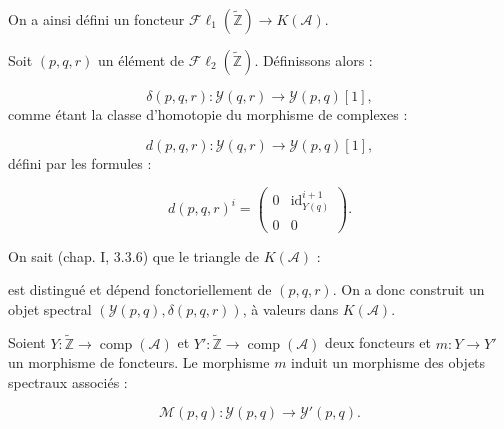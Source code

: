 \clearpage
{}%
\begingroup\small\setlength{\parskip}{0pt}\setlength{\emergencystretch}{1.5em}
\setlength{\abovedisplayskip}{4pt plus 2pt minus 2pt}%
\setlength{\belowdisplayskip}{4pt plus 2pt minus 2pt}%

On a ainsi défini un foncteur
$\mathcal{F}\ell_1(\widetilde{\mathbb Z})\longrightarrow K(\mathcal A)$.

Soit $(p,q,r)$ un élément de
$\mathcal{F}\ell_2(\widetilde{\mathbb Z})$. Définissons alors :

\begin{equation}
\delta(p,q,r)\colon\mathcal Y(q,r)\longrightarrow\mathcal Y(p,q)[1],
\tag{4.1.1.6}
\end{equation}
comme étant la classe d'homotopie du morphisme de complexes :

\begin{equation}
d(p,q,r)\colon\mathcal Y(q,r)\longrightarrow\mathcal Y(p,q)[1],
\tag{4.1.1.7}
\end{equation}
défini par les formules :

\begin{equation}
d(p,q,r)^i=
\begin{pmatrix}
0 & \operatorname{id}_{Y(q)}^{i+1}\\
0 & 0
\end{pmatrix}.
\tag{4.1.1.8}
\end{equation}

On sait (chap. I, 3.3.6) que le triangle de $K(\mathcal A)$ :

\begin{center}
\end{center}
est distingué et dépend fonctoriellement de $(p,q,r)$. On a donc construit
un objet spectral $(\mathcal Y(p,q),\delta(p,q,r))$, à valeurs dans
$K(\mathcal A)$.

Soient $Y\colon\widetilde{\mathbb Z}\longrightarrow
\operatorname{comp}(\mathcal A)$ et
$Y'\colon\widetilde{\mathbb Z}\longrightarrow
\operatorname{comp}(\mathcal A)$ deux foncteurs et $m\colon Y\longrightarrow
Y'$ un morphisme de foncteurs. Le morphisme $m$ induit un morphisme des
objets spectraux associés :

\begin{equation}
\mathcal M(p,q)\colon\mathcal Y(p,q)\longrightarrow\mathcal Y'(p,q).
\tag{4.1.1.9}
\end{equation}

